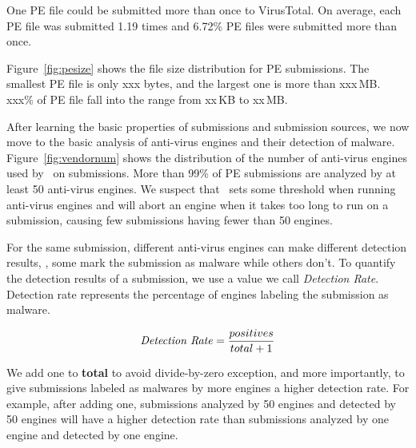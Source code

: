 One PE file could be submitted more than once to VirusTotal. 
On average, each PE file was submitted 1.19 times and 6.72\% PE files were submitted more than once. 


Figure~\ref{fig:pesize} shows the file size distribution for PE submissions. 
The smallest PE file is only xxx bytes, and the largest one is more than xxx\,MB. 
xxx\% of PE file fall into the range from xx\,KB to xx\,MB. 




After learning the basic properties of submissions and submission sources, 
we now move to the basic analysis of anti-virus engines and their detection of malware.
Figure~\ref{fig:vendornum} shows the distribution of the number of anti-virus engines used by \vt\ on submissions. 
More than 99\% of PE submissions are analyzed by at least 50 anti-virus engines. 
We suspect that \vt\ sets some threshold when running anti-virus engines and 
will abort an engine when it takes too long to run on a submission,
causing few submissions having fewer than 50 engines.

For the same submission, different anti-virus engines can make different detection results, \ie, some mark the submission as malware while others don't.
To quantify the detection results of a submission,
we use a value we call {\em Detection Rate}.
Detection rate represents the percentage of engines labeling the submission as malware. 

$$ \textrm{\textit{Detection Rate}} = \dfrac{positives}{total + 1}$$

We add one to {\bf total} to avoid divide-by-zero exception, and more importantly, 
to give submissions labeled as malwares by more engines a higher detection rate. 
For example, after adding one, submissions analyzed by 50 engines and detected by 50 engines will have a higher detection rate 
than submissions analyzed by one engine and detected by one engine. 


